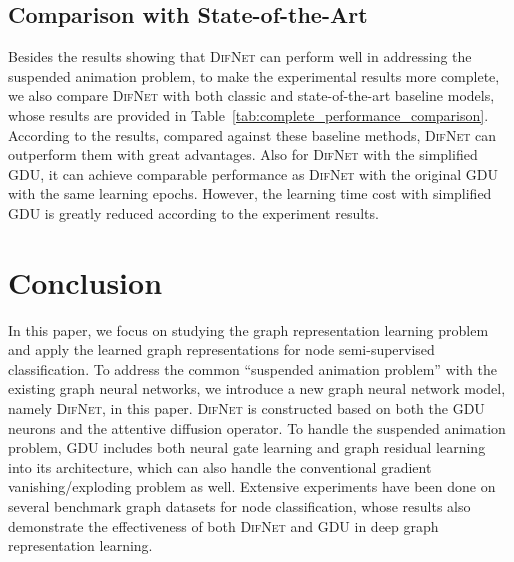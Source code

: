 \documentclass{article}
\newcommand{\our}{\textsc{DifNet}}
\newcommand{\gdu}{\textsc{GDU}}
\begin{document}
\vspace{-5pt}
\subsection{Comparison with State-of-the-Art}
 
Besides the results showing that {\our} can perform well in addressing the suspended animation problem, to make the experimental results more complete, we also compare {\our} with both classic and state-of-the-art baseline models, whose results are provided in Table~\ref{tab:complete_performance_comparison}. According to the results, compared against these baseline methods, {\our} can outperform them with great advantages. Also for {\our} with the simplified {\gdu}, it can achieve comparable performance as {\our} with the original {\gdu} with the same learning epochs. However, the learning time cost with simplified {\gdu} is greatly reduced according to the experiment results.












\vspace{-7pt}
\section{Conclusion}\label{sec:conclusion}
\vspace{-4pt}

In this paper, we focus on studying the graph representation learning problem and apply the learned graph representations for node semi-supervised classification. To address the common ``suspended animation problem'' with the existing graph neural networks, we introduce a new graph neural network model, namely {\our}, in this paper. {\our} is constructed based on both the {\gdu} neurons and the attentive diffusion operator. To handle the suspended animation problem, {\gdu} includes both neural gate learning and graph residual learning into its architecture, which can also handle the conventional gradient vanishing/exploding problem as well. Extensive experiments have been done on several benchmark graph datasets for node classification, whose results also demonstrate the effectiveness of both {\our} and {\gdu} in deep graph representation learning.
\newpage
{\small


}
\end{document}
